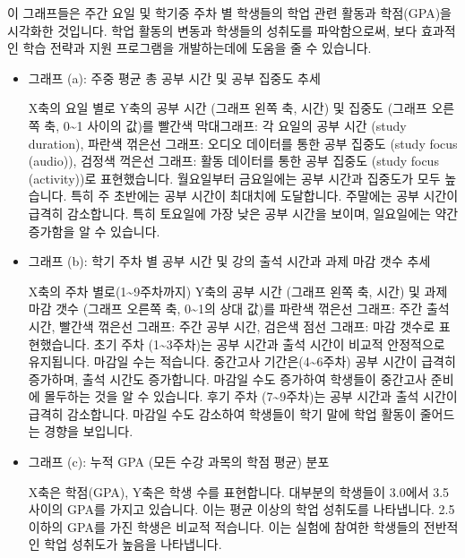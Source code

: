 \documentclass[
  letterpaper,
]{book}
\begin{document}
이 그래프들은 주간 요일 및 학기중 주차 별 학생들의 학업 관련 활동과
학점(GPA)을 시각화한 것입니다. 학업 활동의 변동과 학생들의 성취도를
파악함으로써, 보다 효과적인 학습 전략과 지원 프로그램을 개발하는데에
도움을 줄 수 있습니다.

\begin{itemize}
\item
  그래프 (a): 주중 평균 총 공부 시간 및 공부 집중도 추세

  X축의 요일 별로 Y축의 공부 시간 (그래프 왼쪽 축, 시간) 및 집중도
  (그래프 오른쪽 축, 0\textasciitilde1 사이의 값)를 빨간색 막대그래프:
  각 요일의 공부 시간 (study duration), 파란색 꺾은선 그래프: 오디오
  데이터를 통한 공부 집중도 (study focus (audio)), 검정색 꺽은선 그래프:
  활동 데이터를 통한 공부 집중도 (study focus (activity))로
  표현했습니다. 월요일부터 금요일에는 공부 시간과 집중도가 모두
  높습니다. 특히 주 초반에는 공부 시간이 최대치에 도달합니다. 주말에는
  공부 시간이 급격히 감소합니다. 특히 토요일에 가장 낮은 공부 시간을
  보이며, 일요일에는 약간 증가함을 알 수 있습니다.
\item
  그래프 (b): 학기 주차 별 공부 시간 및 강의 출석 시간과 과제 마감 갯수
  추세

  X축의 주차 별로(1\textasciitilde9주차까지) Y축의 공부 시간 (그래프
  왼쪽 축, 시간) 및 과제 마감 갯수 (그래프 오른쪽 축,
  0\textasciitilde1의 상대 값)를 파란색 꺾은선 그래프: 주간 출석 시간,
  빨간색 꺾은선 그래프: 주간 공부 시간, 검은색 점선 그래프: 마감 갯수로
  표현했습니다. 초기 주차 (1\textasciitilde3주차)는 공부 시간과 출석
  시간이 비교적 안정적으로 유지됩니다. 마감일 수는 적습니다. 중간고사
  기간은(4\textasciitilde6주차) 공부 시간이 급격히 증가하며, 출석 시간도
  증가합니다. 마감일 수도 증가하여 학생들이 중간고사 준비에 몰두하는
  것을 알 수 있습니다. 후기 주차 (7\textasciitilde9주차)는 공부 시간과
  출석 시간이 급격히 감소합니다. 마감일 수도 감소하여 학생들이 학기 말에
  학업 활동이 줄어드는 경향을 보입니다.
\item
  그래프 (c): 누적 GPA (모든 수강 과목의 학점 평균) 분포

  X축은 학점(GPA), Y축은 학생 수를 표현합니다. 대부분의 학생들이 3.0에서
  3.5 사이의 GPA를 가지고 있습니다. 이는 평균 이상의 학업 성취도를
  나타냅니다. 2.5 이하의 GPA를 가진 학생은 비교적 적습니다. 이는 실험에
  참여한 학생들의 전반적인 학업 성취도가 높음을 나타냅니다.
\end{itemize}
\end{document}

